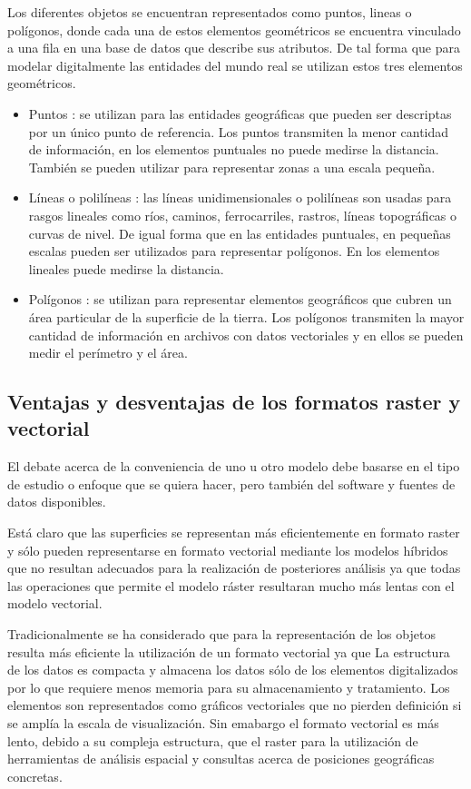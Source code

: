 Los diferentes objetos se encuentran representados como puntos, lineas o polígonos, donde cada una de estos elementos
geométricos se encuentra vinculado a una fila en una base de datos que describe sus atributos. De tal forma que para modelar 
digitalmente las entidades del mundo real se utilizan estos tres elementos geométricos.
\begin{itemize}
    \item Puntos : se utilizan para las entidades geográficas que pueden ser descriptas por un único punto de referencia. Los 
    puntos transmiten la menor cantidad de información, en los elementos puntuales no puede medirse la distancia. También 
    se pueden utilizar para representar zonas a una escala pequeña.
    
    \item Líneas o polilíneas : las líneas unidimensionales o polilíneas son usadas para rasgos lineales como ríos, 
    caminos, ferrocarriles, rastros, líneas topográficas o curvas de nivel. De igual forma que en las entidades 
    puntuales, en pequeñas escalas pueden ser utilizados para representar polígonos. En los elementos lineales puede
    medirse la distancia. 
    
    \item Polígonos : se utilizan para representar elementos geográficos que cubren un área particular de la superficie de la tierra.
    Los polígonos transmiten la mayor cantidad de información en archivos con datos vectoriales y en ellos se pueden medir el 
    perímetro y el área.
    
\end{itemize}

\subsection{Ventajas y desventajas de los formatos raster y vectorial}
El debate acerca de la conveniencia de uno u otro modelo debe basarse en el tipo de estudio o enfoque que se quiera 
hacer, pero también del software y fuentes de datos disponibles.

Está claro que las superficies se representan más eficientemente en formato raster y sólo pueden representarse
en formato vectorial mediante los modelos híbridos que no resultan adecuados para la realización de posteriores 
análisis ya que todas las operaciones que permite el modelo ráster resultaran mucho más lentas con el modelo 
vectorial. 

Tradicionalmente se ha considerado que para la representación de los objetos resulta más eficiente la utilización 
de un formato vectorial ya que La estructura de los datos es compacta y almacena los datos sólo de los elementos 
digitalizados por lo que requiere menos memoria para su almacenamiento y tratamiento. Los elementos son representados 
como gráficos vectoriales que no pierden definición si se amplía la escala de visualización. Sin emabargo el formato 
vectorial es más lento, debido a su compleja estructura, que el raster para la utilización de herramientas de análisis 
espacial y consultas acerca de posiciones geográficas concretas.

